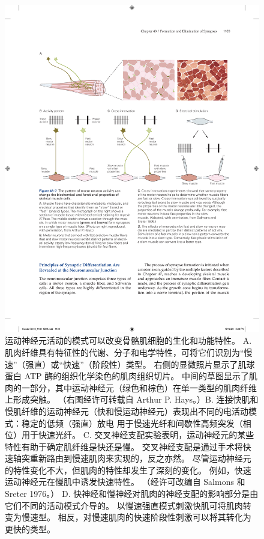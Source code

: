 \begin{figure}[htbp]
	\centering
	\includegraphics[width=0.95\linewidth]{chap48/fig_48_7}
	\caption{运动神经元活动的模式可以改变骨骼肌细胞的生化和功能特性。 A. 肌肉纤维具有特征性的代谢、分子和电学特性，可将它们识别为“慢速”（强直）或“快速”（阶段性）类型。 右侧的显微照片显示了肌球蛋白 ATP 酶的组织化学染色的肌肉组织切片。 中间的草图显示了肌肉的一部分，其中运动神经元（绿色和棕色）在单一类型的肌肉纤维上形成突触。 （右图经许可转载自 Arthur P. Hays。）B. 连接快肌和慢肌纤维的运动神经元（快和慢运动神经元）表现出不同的电活动模式：稳定的低频（强直）放电 用于慢速光纤和间歇性高频突发（相位）用于快速光纤。 C. 交叉神经支配实验表明，运动神经元的某些特性有助于确定肌纤维是快还是慢。 交叉神经支配是通过手术将快速轴突重新路由到慢速肌肉来实现的，反之亦然。 尽管运动神经元的特性变化不大，但肌肉的特性却发生了深刻的变化。 例如，快速运动神经元在慢肌中诱发快速特性。 （经许可改编自 Salmons 和 Sreter 1976。） D. 快神经和慢神经对肌肉的神经支配的影响部分是由它们不同的活动模式介导的。 以慢速强直模式刺激快肌可将肌肉转变为慢速型。 相反，对慢速肌肉的快速阶段性刺激可以将其转化为更快的类型。}
	\label{fig:48_7}
\end{figure}

